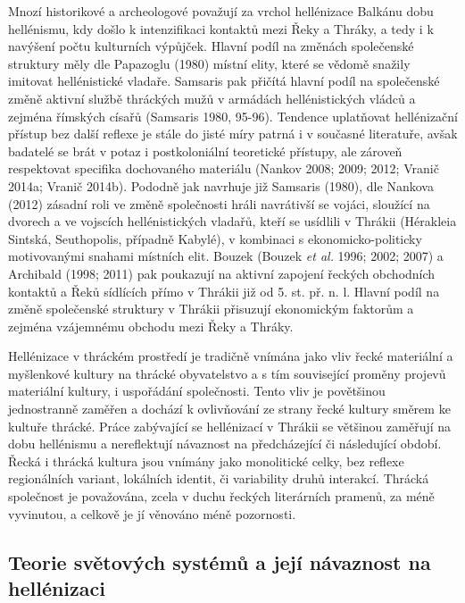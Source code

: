 Mnozí historikové a archeologové považují za vrchol hellénizace Balkánu dobu hellénismu, kdy došlo k intenzifikaci kontaktů mezi Řeky a Thráky, a tedy i k navýšení počtu kulturních výpůjček. Hlavní podíl na změnách společenské struktury měly dle Papazoglu (1980) místní elity, které se vědomě snažily imitovat hellénistické vladaře. Samsaris pak přičítá hlavní podíl na společenské změně aktivní službě thráckých mužů v armádách hellénistických vládců a zejména římských císařů (Samsaris 1980, 95-96). Tendence uplatňovat hellénizační přístup bez další reflexe je stále do jisté míry patrná i v současné literatuře, avšak badatelé se brát v potaz i postkoloniální teoretické přístupy, ale zároveň respektovat specifika dochovaného materiálu (Nankov 2008; 2009; 2012; Vranič 2014a; Vranič 2014b). Pododně jak navrhuje již Samsaris (1980), dle Nankova (2012) zásadní roli ve změně společnosti hráli navrátivší se vojáci, sloužící na dvorech a ve vojscích hellénistických vladařů, kteří se usídlili v Thrákii (Hérakleia Sintská, Seuthopolis, případně Kabylé), v kombinaci s ekonomicko-politicky motivovanými snahami místních elit. Bouzek (Bouzek {\em et al.} 1996; 2002; 2007) a Archibald (1998; 2011) pak poukazují na aktivní zapojení řeckých obchodních kontaktů a Řeků sídlících přímo v Thrákii již od 5. st. př. n. l. Hlavní podíl na změně společenské struktury v Thrákii přisuzují ekonomickým faktorům a zejména vzájemnému obchodu mezi Řeky a Thráky.

Hellénizace v thráckém prostředí je tradičně vnímána jako vliv řecké materiální a myšlenkové kultury na thrácké obyvatelstvo a s tím související proměny projevů materiální kultury, i uspořádání společnosti. Tento vliv je povětšinou jednostranně zaměřen a dochází k ovlivňování ze strany řecké kultury směrem ke kultuře thrácké. Práce zabývající se hellénizací v Thrákii se většinou zaměřují na dobu hellénismu a nereflektují návaznost na předcházející či následující období. Řecká i thrácká kultura jsou vnímány jako monolitické celky, bez reflexe regionálních variant, lokálních identit, či variability druhů interakcí. Thrácká společnost je považována, zcela v duchu řeckých literárních pramenů, za méně vyvinutou, a celkově je jí věnováno méně pozornosti.

\subsection[teorie-světových-systémů-a-její-návaznost-na-hellénizaci]{Teorie světových systémů a její návaznost na hellénizaci}

